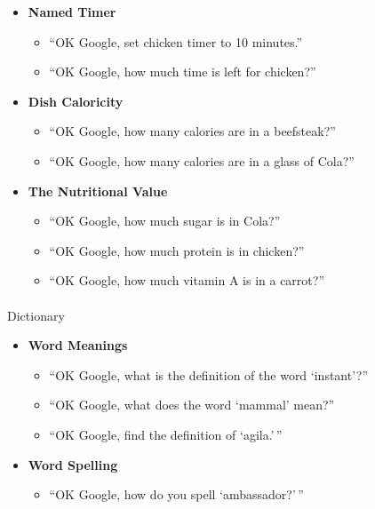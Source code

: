 \documentclass[
  a4paper,
]{article}
\makeatletter
\let\oldparagraph\paragraph
\renewcommand{\paragraph}{
    \@ifstar
      \xxxParagraphStar
      \xxxParagraphNoStar
  }
\newcommand{\xxxParagraphStar}[1]{\oldparagraph*{#1}\mbox{}}
\newcommand{\xxxParagraphNoStar}[1]{\oldparagraph{#1}\mbox{}}
\providecommand{\tightlist}{%
  \setlength{\itemsep}{0pt}\setlength{\parskip}{0pt}}\usepackage{longtable,booktabs,array}
\makeatother
\begin{document}
\begin{itemize}
\tightlist
\item
  \textbf{Named Timer}

  \begin{itemize}
  \tightlist
  \item
    ``OK Google, set chicken timer to 10 minutes.''
  \item
    ``OK Google, how much time is left for chicken?''
  \end{itemize}
\item
  \textbf{Dish Caloricity}

  \begin{itemize}
  \tightlist
  \item
    ``OK Google, how many calories are in a beefsteak?''
  \item
    ``OK Google, how many calories are in a glass of Cola?''
  \end{itemize}
\item
  \textbf{The Nutritional Value}

  \begin{itemize}
  \tightlist
  \item
    ``OK Google, how much sugar is in Cola?''
  \item
    ``OK Google, how much protein is in chicken?''
  \item
    ``OK Google, how much vitamin A is in a carrot?''
  \end{itemize}
\end{itemize}

\paragraph{Dictionary}\label{dictionary}

\begin{itemize}
\tightlist
\item
  \textbf{Word Meanings}

  \begin{itemize}
  \tightlist
  \item
    ``OK Google, what is the definition of the word `instant'?''
  \item
    ``OK Google, what does the word `mammal' mean?''
  \item
    ``OK Google, find the definition of `agila.'\,''
  \end{itemize}
\item
  \textbf{Word Spelling}

  \begin{itemize}
  \tightlist
  \item
    ``OK Google, how do you spell `ambassador?'\,''
  \end{itemize}
\end{itemize}
\end{document}
